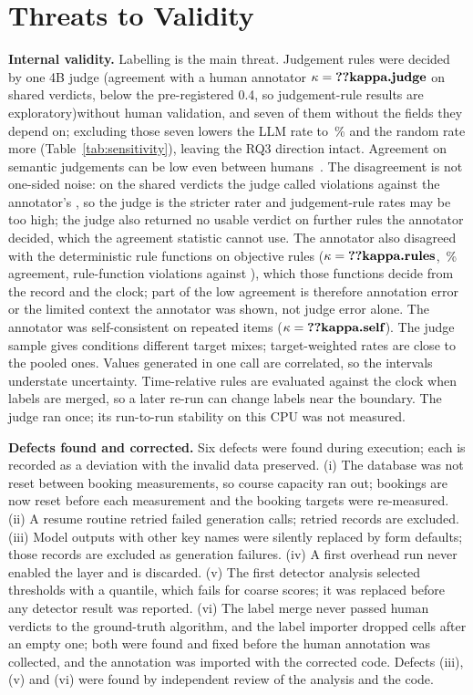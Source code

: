 \documentclass[conference]{IEEEtran}
\begin{document}
\section{Threats to Validity}
\label{sec:threats}

\textbf{Internal validity.} Labelling is the main threat. Judgement rules were decided by one 4B judge
\ifhumanlabels (agreement with a human annotator $\kappa=\R{kappa.judge}$ on  shared
verdicts, below the pre-registered 0.4, so judgement-rule results are exploratory)\else without human
validation\fi, and seven of them without the fields they depend on; excluding those seven
lowers the LLM rate to \,\% and the random rate more (Table~\ref{tab:sensitivity}),
leaving the RQ3 direction intact. Agreement on semantic judgements can be low even between
humans~\cite{calo2026semanticgap}.\ifhumanlabels{} The disagreement is not one-sided noise: on the
shared verdicts the judge called  violations against the annotator's
, so the judge is the stricter rater and judgement-rule rates may be too high; the judge also returned
no usable verdict on  further rules the annotator decided, which the agreement
statistic cannot use. The
annotator also disagreed with the deterministic rule functions on objective rules
($\kappa=\R{kappa.rules}$, \,\% agreement,  rule-function violations
against ), which those functions decide from the record and the clock; part of the
low agreement is therefore annotation error or the limited context the annotator was shown, not judge
error alone. The annotator was self-consistent on repeated items ($\kappa=\R{kappa.self}$).\fi{} The judge sample gives conditions different target mixes;
target-weighted rates are close to the pooled ones. Values generated in one call are correlated, so
the intervals understate uncertainty. Time-relative rules are evaluated against the clock when labels
are merged, so a later re-run can change labels near the boundary. The judge ran once; its run-to-run
stability on this CPU was not measured.

\textbf{Defects found and corrected.} Six defects were found during execution; each is recorded as a
deviation with the invalid data preserved. (i) The database was not reset between booking
measurements, so course capacity ran out; bookings are now reset before each measurement and the
booking targets were re-measured. (ii) A resume routine retried failed generation calls; retried
records are excluded. (iii) Model outputs with other key names were silently replaced by form
defaults; those records are excluded as generation failures. (iv) A first overhead run never enabled
the layer and is discarded. (v) The first detector analysis selected thresholds with a quantile, which
fails for coarse scores; it was replaced before any detector result was reported. (vi) The label merge
never passed human verdicts to the ground-truth algorithm, and the label importer dropped cells after
an empty one; both were found and fixed before the human annotation was collected, and the annotation
was imported with the corrected code. Defects (iii), (v) and (vi) were found by independent review of
the analysis and the code.
\end{document}
